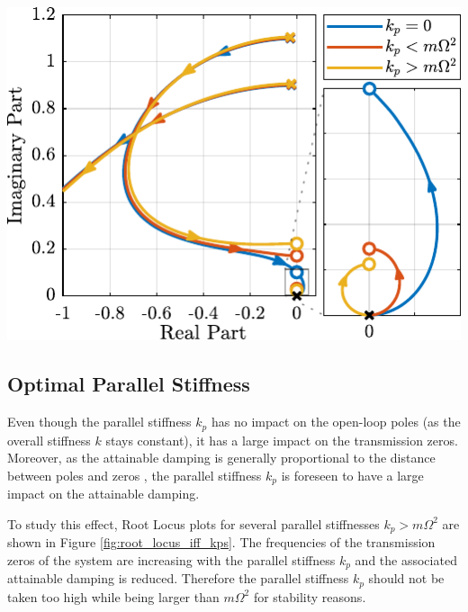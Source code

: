 \documentclass{ISMA_USD2020}
\begin{document}
\begin{minipage}[b]{0.52\linewidth}
\begin{center}
\includegraphics[scale=1]{figs/root_locus_iff_kp.pdf}
\end{center}
\end{minipage}

\subsection{Optimal Parallel Stiffness}
\label{sec:org1c9ca29}
Even though the parallel stiffness \(k_p\) has no impact on the open-loop poles (as the overall stiffness \(k\) stays constant), it has a large impact on the transmission zeros.
Moreover, as the attainable damping is generally proportional to the distance between poles and zeros \cite{preumont18_vibrat_contr_activ_struc_fourt_edition}, the parallel stiffness \(k_p\) is foreseen to have a large impact on the attainable damping.

To study this effect, Root Locus plots for several parallel stiffnesses \(k_p > m \Omega^2\) are shown in Figure \ref{fig:root_locus_iff_kps}.
The frequencies of the transmission zeros of the system are increasing with the parallel stiffness \(k_p\) and the associated attainable damping is reduced.
Therefore the parallel stiffness \(k_p\) should not be taken too high while being larger than \(m \Omega^2\) for stability reasons.
\end{document}
